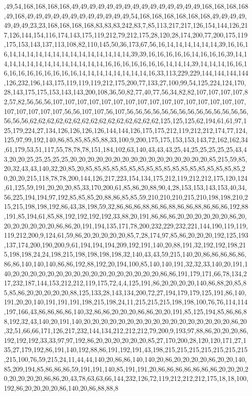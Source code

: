 ,49,54,168,168,168,168,49,49,49,49,49,49,49,49,49,49,49,49,49,49,49,168,168,168,168,49,168,49,49,49,49,49,49,49,49,49,49,49,49,54,168,168,168,168,168,168,49,49,49,49,49,49,49,23,23,168,168,168,168,83,83,83,242,83,7,85,113,217,217,126,154,144,126,217,126,144,154,116,174,143,175,119,212,79,212,175,28,120,28,174,200,77,200,175,119,175,153,143,137,113,108,82,110,145,50,36,173,67,56,16,14,14,14,14,14,14,39,16,16,16,14,14,14,14,14,14,14,14,14,14,14,14,14,14,39,39,16,16,16,16,16,14,16,16,16,39,14,14,14,14,14,14,14,14,14,14,14,14,14,16,16,16,16,16,16,16,14,14,14,39,14,14,14,16,16,16,16,16,16,16,16,16,16,16,14,14,14,14,14,14,14,14,16,33,113,229,229,144,144,144,144,126,232,196,143,175,119,119,119,212,175,200,77,133,27,100,99,54,125,224,124,170,28,143,175,175,153,143,143,200,108,36,50,82,77,40,77,56,34,82,82,107,107,107,107,82,57,82,56,56,56,107,107,107,107,107,107,107,107,107,107,107,107,107,107,107,107,107,107,107,107,107,56,56,107,107,56,107,56,56,56,56,56,56,56,56,56,56,56,56,56,56,56,56,56,62,62,62,62,62,62,62,62,62,62,62,62,62,62,62,125,125,125,62,194,61,61,97,125,179,224,27,134,126,126,126,126,144,144,126,175,175,212,119,212,212,174,77,124,125,97,99,192,140,86,85,85,85,85,88,33,100,9,200,175,175,153,153,143,72,162,162,34,61,179,53,51,117,55,78,78,78,151,184,102,63,140,43,43,43,25,44,25,25,25,25,25,43,43,20,20,25,25,25,25,25,20,20,20,20,20,20,20,20,20,20,20,20,20,20,20,20,85,215,59,85,20,32,43,43,140,32,20,85,20,85,85,85,85,85,85,85,85,85,85,85,85,85,85,85,85,85,85,20,20,20,215,118,78,78,200,144,126,217,223,154,134,175,212,119,212,212,175,120,124,61,125,59,191,20,20,20,85,33,170,200,61,85,86,20,88,90,4,28,153,153,143,153,40,34,56,225,194,194,97,192,85,85,85,20,88,86,85,85,59,210,210,210,215,210,198,198,210,215,215,198,198,192,86,43,38,198,59,32,86,86,86,88,86,86,88,86,86,88,86,86,86,192,88,191,85,194,61,85,88,192,192,192,192,33,88,20,191,86,86,86,20,20,20,20,20,20,86,20,20,20,20,20,20,20,86,86,20,191,194,135,171,78,200,232,229,232,221,144,190,119,119,119,212,200,9,124,61,59,86,20,20,20,20,20,85,7,28,174,97,85,86,20,20,20,192,125,193,137,174,200,190,200,9,61,194,194,194,209,192,191,140,20,88,191,32,192,192,198,215,198,198,24,24,198,215,198,198,198,198,32,140,43,43,59,215,140,20,86,86,86,86,86,86,86,140,140,140,86,86,192,88,192,20,194,100,85,140,140,191,32,32,33,140,20,191,140,20,20,20,20,20,20,20,20,20,20,20,20,20,20,20,20,20,86,86,191,179,171,66,78,134,217,232,187,144,153,212,212,119,175,72,4,4,125,191,86,20,20,20,20,140,86,88,20,85,85,85,86,20,20,20,20,20,88,125,133,28,143,134,200,72,27,194,179,179,125,191,86,140,191,20,20,140,191,191,191,198,215,198,24,11,215,215,215,198,198,100,76,76,114,114,197,166,43,86,86,86,86,140,32,86,86,20,20,20,86,86,20,20,191,85,125,194,85,86,86,88,192,32,43,140,20,191,140,20,20,20,20,20,20,20,20,20,20,20,20,20,20,20,20,20,86,20,32,51,66,66,171,126,217,232,144,134,212,212,212,79,200,9,193,97,88,86,20,20,20,86,192,192,192,33,33,97,97,192,86,20,20,20,20,20,20,85,27,170,200,28,120,120,171,27,135,27,179,192,86,191,140,192,88,86,191,192,191,43,198,215,215,215,215,215,215,215,215,100,76,59,215,24,11,44,44,140,20,86,86,140,140,20,86,20,20,20,20,86,20,20,140,85,209,194,85,86,86,86,59,191,191,140,85,191,191,20,86,86,86,86,86,86,86,20,20,20,20,20,20,20,20,86,86,20,43,78,63,63,66,144,232,126,72,119,212,212,212,175,18,18,100,192,86,20,20,20,20,86,140,20,86,88,88,8
